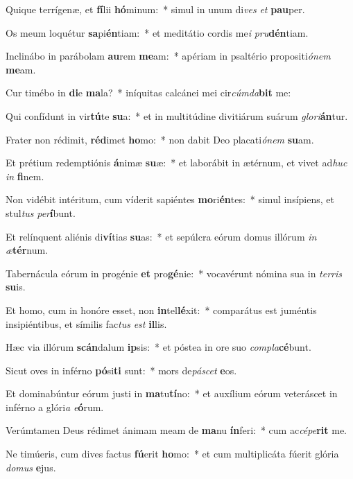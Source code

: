 \item Quique terrígenæ, et \textbf{fí}lii \textbf{hó}minum:~* simul in unum di\textit{ves} \textit{et} \textbf{pau}per.
\item Os meum loquétur \textbf{sa}pi\textbf{én}tiam:~* et meditátio cordis me\textit{i} \textit{pru}\textbf{dén}tiam.
\item Inclinábo in parábolam \textbf{au}rem \textbf{me}am:~* apériam in psaltério propositi\textit{ó}\textit{nem} \textbf{me}am.
\item Cur timébo in \textbf{di}e \textbf{ma}la?~* iníquitas calcánei mei cir\textit{cúm}\textit{da}\textbf{bit} me:
\item Qui confídunt in vir\textbf{tú}te \textbf{su}a:~* et in multitúdine divitiárum suárum \textit{glo}\textit{ri}\textbf{án}tur.
\item Frater non rédimit, \textbf{réd}imet \textbf{ho}mo:~* non dabit Deo placati\textit{ó}\textit{nem} \textbf{su}am.
\item Et prétium redemptiónis \textbf{á}nimæ \textbf{su}æ:~* et laborábit in ætérnum, et vivet ad\textit{huc} \textit{in} \textbf{fi}nem.
\item Non vidébit intéritum, cum víderit sapiéntes \textbf{mo}ri\textbf{én}tes:~* simul insípiens, et stul\textit{tus} \textit{per}\textbf{í}bunt.
\item Et relínquent aliénis di\textbf{ví}tias \textbf{su}as:~* et sepúlcra eórum domus illórum \textit{in} \textit{æ}\textbf{tér}num.
\item Tabernácula eórum in progénie \textbf{et} pro\textbf{gé}nie:~* vocavérunt nómina sua in \textit{ter}\textit{ris} \textbf{su}is.
\item Et homo, cum in honóre esset, non \textbf{in}tel\textbf{lé}xit:~* comparátus est juméntis insipiéntibus, et símilis fac\textit{tus} \textit{est} \textbf{il}lis.
\item Hæc via illórum \textbf{scán}dalum \textbf{ip}sis:~* et póstea in ore suo \textit{com}\textit{pla}\textbf{cé}bunt.
\item Sicut oves in inférno \textbf{pó}si\textbf{ti} sunt:~* mors de\textit{pá}\textit{scet} \textbf{e}os.
\item Et dominabúntur eórum justi in \textbf{ma}tu\textbf{tí}no:~* et auxílium eórum veteráscet in inférno a glóri\textit{a} \textit{e}\textbf{ó}rum.
\item Verúmtamen Deus rédimet ánimam meam de \textbf{ma}nu \textbf{ín}feri:~* cum ac\textit{cé}\textit{pe}\textbf{rit} me.
\item Ne timúeris, cum dives factus \textbf{fú}erit \textbf{ho}mo:~* et cum multiplicáta fúerit glória \textit{do}\textit{mus} \textbf{e}jus.
